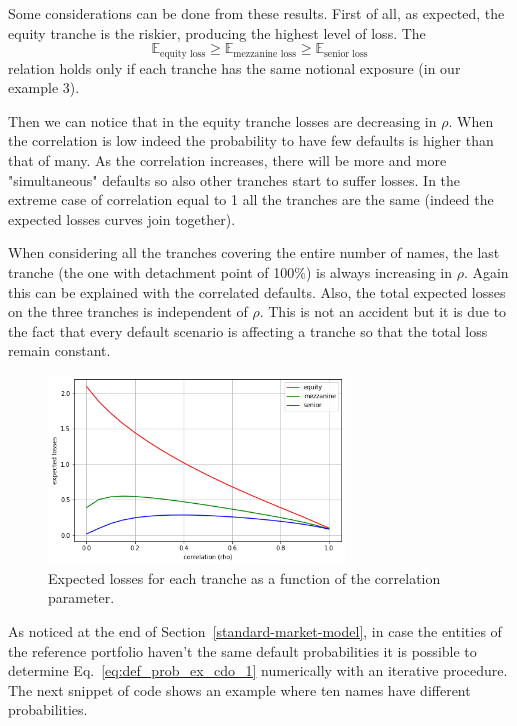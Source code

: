 Some considerations can be done from these results. First of all, as expected, the equity tranche is the riskier, producing the highest level of loss. The 
\begin{equation}
\mathbb{E}_{\textrm{equity loss}} \ge \mathbb{E}_{\textrm{mezzanine loss}} \ge \mathbb{E}_{\textrm{senior loss}}
\end{equation}
relation holds only if each tranche has the same notional exposure (in our example 3).

Then we can notice that in the equity tranche losses are decreasing in $\rho$. When the correlation is low indeed the probability to have few defaults is higher than that of many. As the correlation increases, there will be more and more "simultaneous" defaults so also other tranches start to suffer losses. In the extreme case of correlation equal to 1 all the tranches are the same (indeed the expected losses curves join together). 

When considering all the tranches covering the entire number of names, the last tranche (the one with detachment point of 100\%) is always increasing in $\rho$. Again this can be explained with the correlated defaults. 
Also, the total expected losses on the three tranches is independent of $\rho$. This is not an accident but it is due to the fact that every default scenario is affecting a tranche so that the total loss remain constant.

\begin{figure}[htb]
	\centering
	\includegraphics[width=0.7\textwidth]{figures/losses_vs_rho}
	\caption{Expected losses for each tranche as a function of the correlation parameter.}
	\label{fig:losses_rho}
\end{figure}

As noticed at the end of Section~\ref{standard-market-model}, in case the entities of the reference portfolio haven't the same default probabilities it is possible to determine Eq.~\ref{eq:def_prob_ex_cdo_1} numerically with an iterative procedure. The next snippet of code shows an example where ten names have different probabilities.

